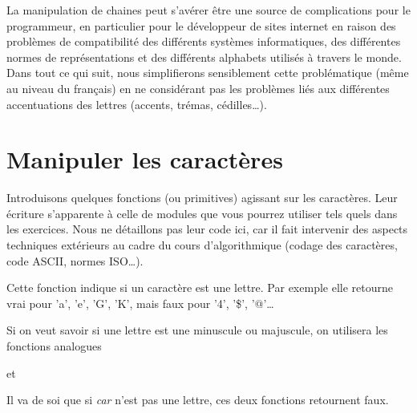 	La manipulation de chaines peut s'avérer être 
	une source de complications pour le programmeur, 
	en particulier pour le développeur de sites internet 
	en raison des problèmes de compatibilité des différents systèmes informatiques, 
	des différentes normes de représentations 
	et des différents alphabets utilisés à travers le monde. 
	Dans tout ce qui suit, 
	nous simplifierons sensiblement cette problématique 
	(même au niveau du français) 
	en ne considérant pas les problèmes liés aux différentes 
	accentuations des lettres (accents, trémas, cédilles\dots). 

\section{Manipuler les caractères}

	Introduisons quelques fonctions (ou primitives) 
	agissant sur les caractères. 
	Leur écriture s'apparente à celle de modules 
	que vous pourrez utiliser tels quels dans les exercices. 
	Nous ne détaillons pas leur code ici, 
	car il fait intervenir des aspects techniques 
	extérieurs au cadre du cours d'algorithmique 
	(codage des caractères, code ASCII, normes ISO\dots).

	\begin{center}
	\end{center}

	Cette fonction indique si un caractère est une lettre. 
	Par exemple elle retourne vrai pour 'a', 'e', 'G', 'K', 
	mais faux pour '4', '\$', '@'\dots %
		
	Si on veut savoir si une lettre est une minuscule ou majuscule, 
	on utilisera les fonctions analogues

	\begin{center}
	\end{center}
	
	et

	\begin{center}
	\end{center}

	Il va de soi que si \textit{car} n'est pas une lettre, 
	ces deux fonctions retournent faux.

	\begin{center}
	\end{center}

